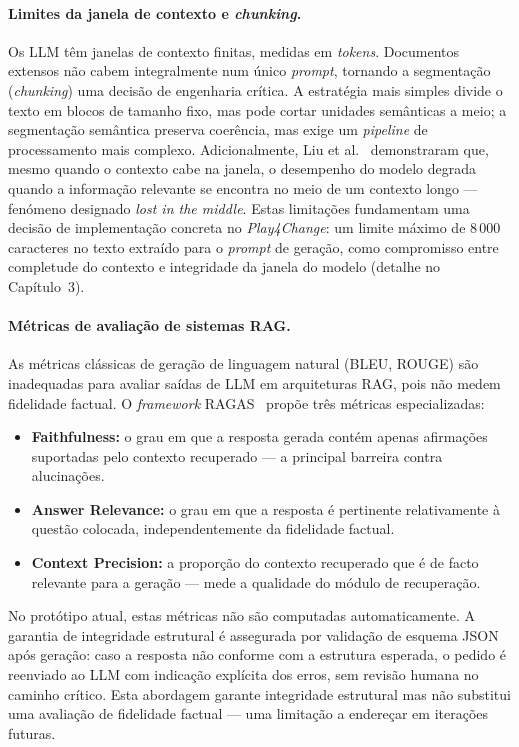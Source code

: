 \paragraph*{Limites da janela de contexto e \emph{chunking}.}
Os LLM têm janelas de contexto finitas, medidas em \emph{tokens}. Documentos extensos não cabem integralmente num único \emph{prompt}, tornando a segmentação (\emph{chunking}) uma decisão de engenharia crítica. A estratégia mais simples divide o texto em blocos de tamanho fixo, mas pode cortar unidades semânticas a meio; a segmentação semântica preserva coerência, mas exige um \emph{pipeline} de processamento mais complexo. Adicionalmente, Liu et al.~\cite{liu2023lost} demonstraram que, mesmo quando o contexto cabe na janela, o desempenho do modelo degrada quando a informação relevante se encontra no meio de um contexto longo --- fenómeno designado \emph{lost in the middle}. Estas limitações fundamentam uma decisão de implementação concreta no \emph{Play4Change}: um limite máximo de 8\,000 caracteres no texto extraído para o \emph{prompt} de geração, como compromisso entre completude do contexto e integridade da janela do modelo (detalhe no Capítulo~3).

\paragraph*{Métricas de avaliação de sistemas RAG.}
As métricas clássicas de geração de linguagem natural (BLEU, ROUGE) são inadequadas para avaliar saídas de LLM em arquiteturas RAG, pois não medem fidelidade factual. O \emph{framework} RAGAS~\cite{es2023ragas} propõe três métricas especializadas:

\begin{itemize}
    \item \textbf{Faithfulness:} o grau em que a resposta gerada contém apenas afirmações suportadas pelo contexto recuperado --- a principal barreira contra alucinações.
    \item \textbf{Answer Relevance:} o grau em que a resposta é pertinente relativamente à questão colocada, independentemente da fidelidade factual.
    \item \textbf{Context Precision:} a proporção do contexto recuperado que é de facto relevante para a geração --- mede a qualidade do módulo de recuperação.
\end{itemize}

No protótipo atual, estas métricas não são computadas automaticamente. A garantia de integridade estrutural é assegurada por validação de esquema JSON após geração: caso a resposta não conforme com a estrutura esperada, o pedido é reenviado ao LLM com indicação explícita dos erros, sem revisão humana no caminho crítico. Esta abordagem garante integridade estrutural mas não substitui uma avaliação de fidelidade factual --- uma limitação a endereçar em iterações futuras.

